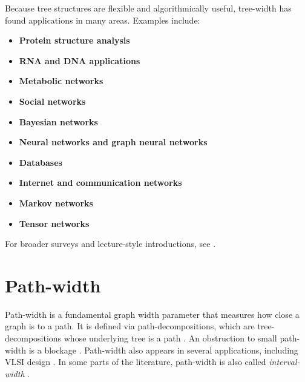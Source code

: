 \documentclass[10pt]{book}
\theoremstyle{definition}
\begin{document}
Because tree structures are flexible and algorithmically useful, tree-width has found applications in many areas.  
Examples include:

\begin{itemize}
    \item \textbf{Protein structure analysis}
    \cite{xu2005tree,peng2015itreepack}
    \item \textbf{RNA and DNA applications}
    \cite{gurski2008polynomial,yao2024infrared}
    \item \textbf{Metabolic networks}
    \cite{cheng2010efficient,panni2015searching,betzler2006steiner}
    \item \textbf{Social networks}
    \cite{adcock2013tree,gupta2022treewidth,Maniu2019AnES}
    \item \textbf{Bayesian networks}
    \cite{elidan2008learning,torrijos2024structural}
    \item \textbf{Neural networks and graph neural networks}
    \cite{zheng2022graph,barcelo2021graph}
    \item \textbf{Databases}
    \cite{fichte2022exploiting,grohe1999definability}
    \item \textbf{Internet and communication networks}
    \cite{Montgolfier2011TreewidthAH}
    \item \textbf{Markov networks}
    \cite{Srebro2001MaximumLB,Liang2004MethodsAE,Karger2001LearningMN}
    \item \textbf{Tensor networks}
    \cite{Dumitrescu2018BenchmarkingTA}
\end{itemize}

For broader surveys and lecture-style introductions, see
\cite{Bodlaender1993ATG,bienstock1989graph}.
\section{Path-width}

Path-width is a fundamental graph width parameter that measures how close a graph is to a path.  
It is defined via path-decompositions, which are tree-decompositions whose underlying tree is a path
\cite{275,277,278,kashyap2008matroid,hatanaka2015list}.  
An obstruction to small path-width is a blockage \cite{46}.  
Path-width also appears in several applications, including VLSI design \cite{318}.  
In some parts of the literature, path-width is also called \emph{interval-width} \cite{409,410}.
\end{document}
